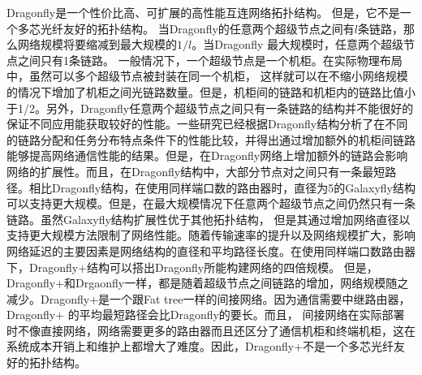 Dragonfly是一个性价比高、可扩展的高性能互连网络拓扑结构。
但是，它不是一个多芯光纤友好的拓扑结构。
当Dragonfly的任意两个超级节点之间有$l$条链路，那么网络规模将要缩减到最大规模的$1/l$。当Dragonfly 最大规模时，任意两个超级节点之间只有1条链路。
一般情况下，一个超级节点是一个机柜。在实际物理布局中，虽然可以多个超级节点被封装在同一个机柜，
这样就可以在不缩小网络规模的情况下增加了机柜之间光链路数量。但是，机柜间的链路和机柜内的链路比值小于1/2。另外，Dragonfly任意两个超级节点之间只有一条链路的结构并不能很好的保证不同应用能获取较好的性能。一些研究已经根据Dragonfly结构分析了在不同的链路分配和任务分布特点条件下的性能比较，并得出通过增加额外的机柜间链路能够提高网络通信性能的结果。但是，在Dragonfly网络上增加额外的链路会影响网络的扩展性。而且，在Dragonfly结构中，大部分节点对之间只有一条最短路径。相比Dragonfly结构，在使用同样端口数的路由器时，直径为5的Galaxyfly结构可以支持更大规模。但是，在最大规模情况下任意两个超级节点之间仍然只有一条链路。虽然Galaxyfly结构扩展性优于其他拓扑结构，
但是其通过增加网络直径以支持更大规模方法限制了网络性能。随着传输速率的提升以及网络规模扩大，影响网络延迟的主要因素是网络结构的直径和平均路径长度。在使用同样端口数路由器下，Dragonfly+结构可以搭出Dragonfly所能构建网络的四倍规模。
但是，Dragonfly+和Drgaonfly一样，都是随着超级节点之间链路的增加，网络规模随之减少。Dragonfly+是一个跟Fat tree一样的间接网络。因为通信需要中继路由器，Dragonfly+ 的平均最短路径会比Dragonfly的要长。而且，
间接网络在实际部署时不像直接网络，网络需要更多的路由器而且还区分了通信机柜和终端机柜，这在系统成本开销上和维护上都增大了难度。因此，Dragonfly+不是一个多芯光纤友好的拓扑结构。

